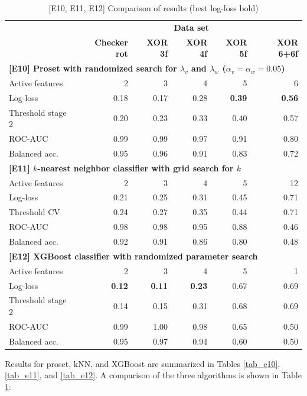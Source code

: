 %
\begin{table}
\caption{[E10, E11, E12] Comparison of results (best log-loss bold)}
\label{tab_e10_e11_e12}
%
\begin{center}
\small
\begin{tabular}{|lrrrrr|}
\hline
&\multicolumn{5}{c|}{\textbf{\hrulefill\ Data set \hrulefill}}\\
&\textbf{Checker rot}&\textbf{XOR 3f}&\textbf{XOR 4f}&\textbf{XOR 5f}&\textbf{XOR 6+6f}\\
\multicolumn{6}{|l|}{\textbf{[E10] Proset with randomized search for $\lambda_v$ and $\lambda_w$ ($\alpha_v=\alpha_w=0.05$)}}\\
Active features&2&3&4&5&6\\
Log-loss&0.18&0.17&0.28&\textbf{0.39}&\textbf{0.56}\\
Threshold stage 2&0.20&0.23&0.33&0.40&0.57\\
ROC-AUC&0.99&0.99&0.97&0.91&0.80\\
Balanced acc.&0.95&0.96&0.91&0.83&0.72\\
\multicolumn{6}{|l|}{\textbf{[E11] $k$-nearest neighbor classifier with grid search for $k$}}\\
Active features&2&3&4&5&12\\
Log-loss&0.21&0.25&0.31&0.45&0.71\\
Threshold CV&0.24&0.27&0.35&0.44&0.71\\
ROC-AUC&0.98&0.98&0.95&0.88&0.46\\
Balanced acc.&0.92&0.91&0.86&0.80&0.48\\
\multicolumn{6}{|l|}{\textbf{[E12] XGBoost classifier with randomized parameter search}}\\
Active features&2&3&4&5&1\\
Log-loss&\textbf{0.12}&\textbf{0.11}&\textbf{0.23}&0.67&0.69\\
Threshold stage 2&0.14&0.15&0.31&0.68&0.69\\
ROC-AUC&0.99&1.00&0.98&0.65&0.50\\
Balanced acc.&0.95&0.97&0.94&0.60&0.50\\
\hline
\end{tabular}
\end{center}
\end{table}
%
\clearpage
%
Results for proset, kNN, and XGBoost are summarized in Tables \ref{tab_e10}, \ref{tab_e11}, and \ref{tab_e12}.
A comparison of the three algorithms is shown in Table \ref{tab_e10_e11_e12}:
%
